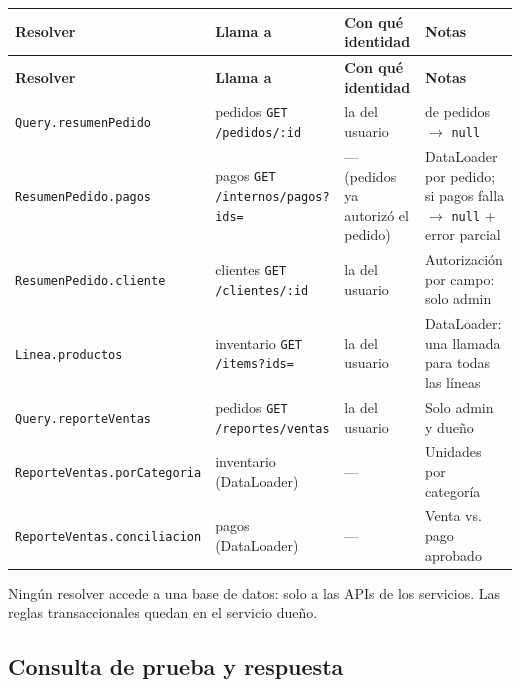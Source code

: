 {\small
\setlength{\tabcolsep}{3pt}\renewcommand{\arraystretch}{1.15}
\begin{longtable}{|>{\raggedright\arraybackslash}p{}|>{\raggedright\arraybackslash}p{}|>{\raggedright\arraybackslash}p{}|>{\raggedright\arraybackslash}p{}|}
\hline
\textbf{Resolver} & \textbf{Llama a} & \textbf{Con qué identidad} & \textbf{Notas} \\ \hline
\endfirsthead
\hline
\textbf{Resolver} & \textbf{Llama a} & \textbf{Con qué identidad} & \textbf{Notas} \\ \hline
\endhead
\texttt{Query.\allowbreak{}resumenPedido} & pedidos \texttt{GET /\allowbreak{}pedidos/\allowbreak{}:\allowbreak{}id} & la del usuario & 404 de pedidos $\rightarrow$ \texttt{null} \\ \hline
\texttt{ResumenPedido.\allowbreak{}pagos} & pagos \texttt{GET /\allowbreak{}internos/\allowbreak{}pagos?\allowbreak{}ids=\allowbreak{}} & — (pedidos ya autorizó el pedido) & DataLoader por pedido; si pagos falla $\rightarrow$ \texttt{null} + error parcial \\ \hline
\texttt{ResumenPedido.\allowbreak{}cliente} & clientes \texttt{GET /\allowbreak{}clientes/\allowbreak{}:\allowbreak{}id} & la del usuario & Autorización por campo: solo admin \\ \hline
\texttt{Linea.\allowbreak{}productos} & inventario \texttt{GET /\allowbreak{}items?\allowbreak{}ids=\allowbreak{}} & la del usuario & DataLoader: una llamada para todas las líneas \\ \hline
\texttt{Query.\allowbreak{}reporteVentas} & pedidos \texttt{GET /\allowbreak{}reportes/\allowbreak{}ventas} & la del usuario & Solo admin y dueño \\ \hline
\texttt{ReporteVentas.\allowbreak{}porCategoria} & inventario (DataLoader) & — & Unidades por categoría \\ \hline
\texttt{ReporteVentas.\allowbreak{}conciliacion} & pagos (DataLoader) & — & Venta vs. pago aprobado \\ \hline
\end{longtable}
}

Ningún resolver accede a una base de datos: solo a las APIs de los servicios. Las reglas transaccionales quedan en el servicio dueño.


\subsection{Consulta de prueba y respuesta}

